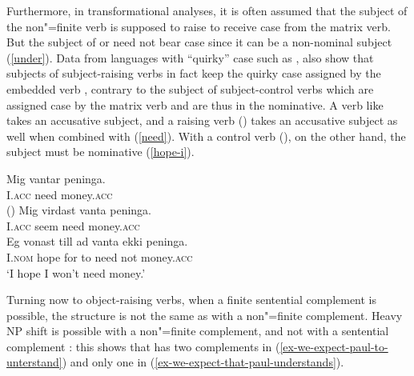 \documentclass[output=paper
	        ,collection
	        ,collectionchapter
 	        ,biblatex
                ,babelshorthands
                ,newtxmath
                ,draftmode
                ,colorlinks, citecolor=brown
]{langscibook}
\begin{document}
Furthermore, in transformational analyses, it is often assumed that the subject of the non"=finite verb  is supposed to raise to receive case from the matrix verb.
 But the subject of  or  need not bear case  since it can be a non-nominal subject (\ref{under}).
Data from languages with ``quirky'' case such as , also show that subjects of subject-raising verbs in fact keep the quirky case assigned by the embedded verb  \citep{Zaenenetal1985}, contrary to the subject of subject-control verbs which are assigned case by the matrix verb and are thus in the nominative. A verb like  takes an accusative subject, and a raising verb () takes an accusative subject as well when combined with  (\ref{need}). With a control verb (), on the other hand, the subject must be nominative (\ref{hope-i}).

\eal
\ex 
\gll Mig vantar peninga.\footnotemark\\
     I.\textsc{acc} need money.\textsc{acc} \\\hfill()
\ex 
\gll Mig virdast vanta peninga. \label{need} \\
     I.\textsc{acc} seem need money.\textsc{acc} \\
\ex 
\gll Eg vonast till ad vanta ekki peninga. \label{hope-i} \\
     I.\textsc{nom} hope for to need not money.\textsc{acc} \\
\glt `I hope I won't need money.'
\zl

Turning now to object-raising verbs, when a finite sentential complement is possible, the structure
is not the same as  with a non"=finite complement. Heavy NP shift is possible with a non"=finite
complement, and not with a sentential complement \parencites[]{Bresnan1982}[]{PollardandSag1994}: this shows that  has two complements in (\ref{ex-we-expect-paul-to-unterstand}) and only one in (\ref{ex-we-expect-that-paul-understands}).

\eal
{}
\zl
\end{document}
